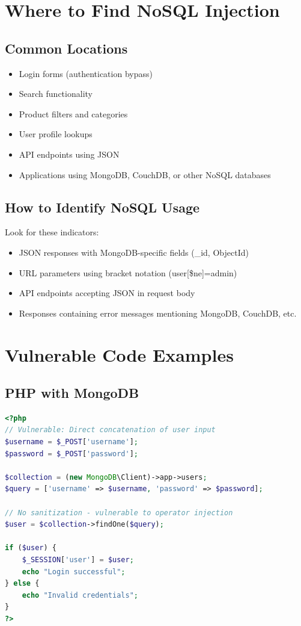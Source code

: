 \documentclass[12pt]{article}
\begin{document}
\section{Where to Find NoSQL Injection}

\subsection{Common Locations}

\begin{itemize}
    \item Login forms (authentication bypass)
    \item Search functionality
    \item Product filters and categories
    \item User profile lookups
    \item API endpoints using JSON
    \item Applications using MongoDB, CouchDB, or other NoSQL databases
\end{itemize}

\subsection{How to Identify NoSQL Usage}

Look for these indicators:

\begin{itemize}
    \item JSON responses with MongoDB-specific fields (\_id, ObjectId)
    \item URL parameters using bracket notation (user[\$ne]=admin)
    \item API endpoints accepting JSON in request body
    \item Responses containing error messages mentioning MongoDB, CouchDB, etc.
\end{itemize}

\section{Vulnerable Code Examples}

\subsection{PHP with MongoDB}

\begin{lstlisting}[language=PHP, caption=Vulnerable PHP/MongoDB Code]
<?php
// Vulnerable: Direct concatenation of user input
$username = $_POST['username'];
$password = $_POST['password'];

$collection = (new MongoDB\Client)->app->users;
$query = ['username' => $username, 'password' => $password];

// No sanitization - vulnerable to operator injection
$user = $collection->findOne($query);

if ($user) {
    $_SESSION['user'] = $user;
    echo "Login successful";
} else {
    echo "Invalid credentials";
}
?>
\end{lstlisting}
\end{document}
